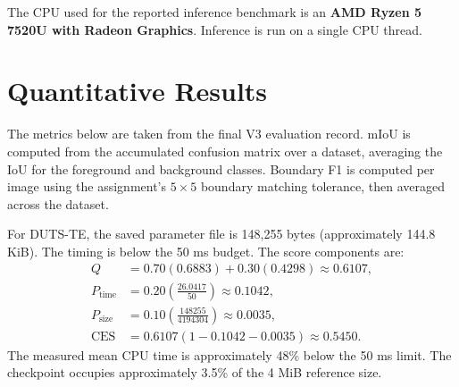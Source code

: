 \documentclass[10pt,a4paper]{article}
\newcommand{\dataset}[1]{\textsc{#1}}
\begin{document}
The CPU used for the reported inference benchmark is an \textbf{AMD Ryzen 5 7520U with Radeon Graphics}. Inference is run on a single CPU thread.

\section{Quantitative Results}

The metrics below are taken from the final V3 evaluation record. mIoU is computed from the accumulated confusion matrix over a dataset, averaging the IoU for the foreground and background classes. Boundary F1 is computed per image using the assignment's $5\times5$ boundary matching tolerance, then averaged across the dataset.

\begin{table}[H]
\centering
\small
\caption{Segmentation quality, single-core CPU latency, parameter checkpoint size, and CES score across the validation set, official test set (\dataset{DUTS-TE}), and captured-photo set.}
\end{table}

For DUTS-TE, the saved parameter file is 148,255 bytes (approximately 144.8 KiB). The timing is below the 50 ms budget. The score components are:
\[
\begin{aligned}
Q &= 0.70(0.6883)+0.30(0.4298) \approx 0.6107,\\
P_{\mathrm{time}} &= 0.20\left(\frac{26.0417}{50}\right) \approx 0.1042,\\
P_{\mathrm{size}} &= 0.10\left(\frac{148255}{4194304}\right) \approx 0.0035,\\
\mathrm{CES} &= 0.6107(1-0.1042-0.0035) \approx \mathbf{0.5450}.
\end{aligned}
\]
The measured mean CPU time is approximately 48\% below the 50 ms limit. The checkpoint occupies approximately 3.5\% of the 4 MiB reference size.
\end{document}
